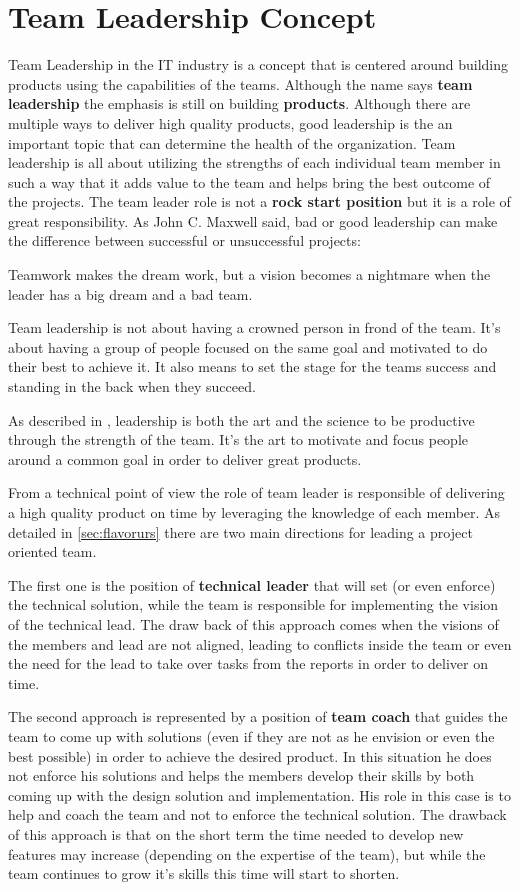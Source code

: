 \section{Team Leadership Concept}
\label{sec:tl}
Team Leadership in the IT industry is a concept that is centered around building products using the capabilities of the teams. Although the name says \textbf{team leadership} the emphasis is still on building \textbf{products}. Although there are multiple ways to deliver high quality products, good leadership is the an important topic that can determine the health of the organization. Team leadership is all about utilizing the strengths of each individual team member in such a way that it adds value to the team and helps bring the best outcome of the projects. The team leader role is not a \textbf{rock start position} but it is a role of great responsibility. As John C. Maxwell said, bad or good leadership can make the difference between successful or unsuccessful projects:
\begin{displayquote}
Teamwork makes the dream work, but a vision becomes a nightmare when the leader has a big dream and a bad team.
\end{displayquote}
Team leadership is not about having a crowned person in frond of the team. It's about having a group of people focused on the same goal and motivated to do their best to achieve it. It also means to set the stage for the teams success and standing in the back when they succeed. 

As described in \cite{abur-tl}, leadership is both the art and the science to be productive through the strength of the team. It's the art to motivate and focus people around a common goal in order to deliver great products.

From a technical point of view the role of team leader is responsible of delivering a high quality product on time by leveraging the knowledge of each member. As detailed in \ref{sec:flavorurs} there are two main directions for leading a project oriented team.

The first one is the position of \textbf{technical leader} that will set (or even enforce) the technical solution, while the team is responsible for implementing the vision of the technical lead. The draw back of this approach comes when the visions of the members and lead are not aligned, leading to conflicts inside the team or even the need for the lead to take over tasks from the reports in order to deliver on time.

The second approach is represented by a position of \textbf{team coach} that guides the team to come up with solutions (even if they are not as he envision or even the best possible) in order to achieve the desired product. In this situation he does not enforce his solutions and helps the members develop their skills by both coming up with the design solution and implementation. His role in this case is to help and coach the team and not to enforce the technical solution. The drawback of this approach is that on the short term the time needed to develop new features may increase (depending on the expertise of the team), but while the team continues to grow it's skills this time will start to shorten.

